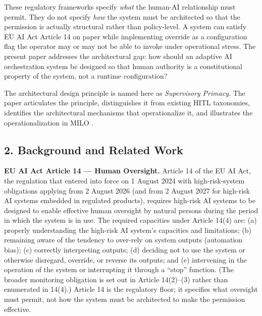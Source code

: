 These regulatory frameworks specify \emph{what} the human-AI
relationship must permit. They do not specify \emph{how} the system must
be architected so that the permission is actually structural rather than
policy-level. A system can satisfy EU AI Act Article 14 on paper while
implementing override as a configuration flag the operator may or may
not be able to invoke under operational stress. The present paper
addresses the architectural gap: how should an adaptive AI orchestration
system be designed so that human authority is a constitutional property
of the system, not a runtime configuration?

The architectural design principle is named here as \emph{Supervisory
Primacy}. The paper articulates the principle, distinguishes it from
existing HITL taxonomies, identifies the architectural mechanisms that
operationalize it, and illustrates the operationalization in MILO
\cite{ref3}.

\subsection{2. Background and Related
Work}\label{background-and-related-work}

\textbf{EU AI Act Article 14 --- Human Oversight.} Article 14 of the EU
AI Act, the regulation that entered into force on 1 August 2024 \cite{ref1}
with high-risk-system obligations applying from 2 August 2026 (and from
2 August 2027 for high-risk AI systems embedded in regulated products),
requires high-risk AI systems to be designed to enable effective human
oversight by natural persons during the period in which the system is in
use. The required capacities under Article 14(4) are: (a) properly
understanding the high-risk AI system's capacities and limitations; (b)
remaining aware of the tendency to over-rely on system outputs
(automation bias); (c) correctly interpreting outputs; (d) deciding not
to use the system or otherwise disregard, override, or reverse its
outputs; and (e) intervening in the operation of the system or
interrupting it through a ``stop'' function. (The broader monitoring
obligation is set out in Article 14(2)--(3) rather than enumerated in
14(4).) Article 14 is the regulatory floor; it specifies what oversight
must permit, not how the system must be architected to make the
permission effective.

